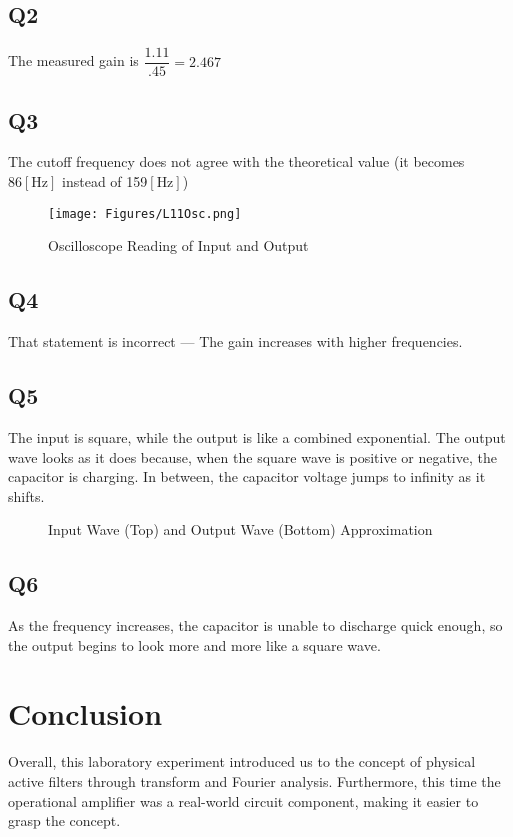 \documentclass[
	letterpaper, %
	10pt, %
]{CSUniSchoolLabReport}
\begin{document}
  \subsection{Q2} The measured gain is $\dfrac{1.11}{.45}=2.467$

  \subsection{Q3} The cutoff frequency does not agree with the theoretical value (it becomes $86[\si{\hertz}]$ instead of 159$[\si{\hertz}]$)

  \begin{figure}[h!]
    \centering
    \texttt{[image: Figures/L11Osc.png]}
    \caption{Oscilloscope Reading of Input and Output}
    \label{fig:1}
  \end{figure}

  \subsection{Q4} That statement is incorrect — The gain increases with higher frequencies.

  \subsection{Q5} The input is square, while the output is like a combined exponential. The output wave looks as it does because, when the square wave is positive or negative, the capacitor is charging. In between, the capacitor voltage jumps to infinity as it shifts.

  \begin{figure}[h!]
    \centering
    
    \caption{Input Wave (Top) and Output Wave (Bottom) Approximation}
    \label{fig:2}
  \end{figure}

  \subsection{Q6} As the frequency increases, the capacitor is unable to discharge quick enough, so the output begins to look more and more like a square wave.

\section{Conclusion}

Overall, this laboratory experiment introduced us to the concept of physical active filters through transform and Fourier analysis. Furthermore, this time the operational amplifier was a real-world circuit component, making it easier to grasp the concept.
\end{document}
